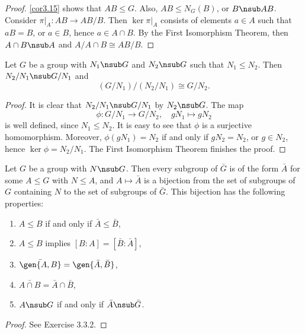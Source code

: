 \begin{proof}
    \autoref{cor3.15} shows that $AB \leq G$. Also, $AB \leq N_G(B)$, or $B \nsub AB$. Consider $\pi |_A : AB \to AB/B$. Then $\ker\pi|_A$ consists of elements $a \in A$ such that $aB = B$, or $a \in B$, hence $a \in A \cap B$. By the First Isomorphism Theorem, then $A \cap B \nsub A$ and $A/A \cap B \cong AB/B$.
\end{proof}

 \label{theo3.19}
Let $G$ be a group with $N_1 \nsub G$ and $N_2 \nsub G$ such that $N_1 \leq N_2$. Then $N_2/N_1 \nsub G/N_1$ and
\[(G/N_1)/(N_2/N_1) \cong G/N_2.\]
\begin{proof}
    It is clear that $N_2/N_1 \nsub G/N_1$ by $N_2 \nsub G$. The map
    \[\phi : G/N_1 \to G/N_2, \quad gN_1 \mapsto gN_2\]
    is well defined, since $N_1 \leq N_2$. It is easy to see that $\phi$ is a surjective homomorphism. Moreover, $\phi(gN_1) = N_2$ if and only if $gN_2 = N_2$, or $g \in N_2$, hence $\ker\phi = N_2/N_1$. The First Isomorphism Theorem finishes the proof.
\end{proof}

 \label{theo3.20}
Let $G$ be a group with $N \nsub G$. Then every subgroup of $\bar G$ is of the form $\bar A$ for some $A \leq G$ with $N \leq A$, and $A \mapsto \bar A$ is a bijection from the set of subgroups of $G$ containing $N$ to the set of subgroups of $\bar G$. This bijection has the following properties:
\begin{enumerate}
    \item $A \leq B$ if and only if $\bar A \leq \bar B$,
    \item $A \leq B$ implies $[B : A] = [\bar B : \bar A]$,
    \item $\bar{\gen{A, B}} = \gen{\bar A, \bar B}$,
    \item $\bar{A \cap B} = \bar A \cap \bar B$,
    \item $A \nsub G$ if and only if $\bar A \nsub \bar G$.
\end{enumerate}

\begin{proof}
    See Exercise 3.3.2.
\end{proof}

